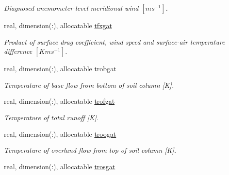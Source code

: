 \begin{DoxyCompactItemize}
\begin{DoxyCompactList}\small\item\em Diagnosed anemometer-\/level meridional wind $[m s^{-1} ]$. \end{DoxyCompactList}\item 
\hypertarget{structclass__statevars_1_1class__gather_ada173f81ba750dffb853c6eeaf18708c}{}real, dimension(\+:), allocatable \hyperlink{structclass__statevars_1_1class__gather_ada173f81ba750dffb853c6eeaf18708c}{tfxgat}\label{structclass__statevars_1_1class__gather_ada173f81ba750dffb853c6eeaf18708c}

\begin{DoxyCompactList}\small\item\em Product of surface drag coefficient, wind speed and surface-\/air temperature difference $[K m s^{-1} ]$. \end{DoxyCompactList}\item 
\hypertarget{structclass__statevars_1_1class__gather_ab547e49919cf3653a91898805ee2a340}{}real, dimension(\+:), allocatable \hyperlink{structclass__statevars_1_1class__gather_ab547e49919cf3653a91898805ee2a340}{trobgat}\label{structclass__statevars_1_1class__gather_ab547e49919cf3653a91898805ee2a340}

\begin{DoxyCompactList}\small\item\em Temperature of base flow from bottom of soil column \mbox{[}K\mbox{]}. \end{DoxyCompactList}\item 
\hypertarget{structclass__statevars_1_1class__gather_ab6fdaaf148cbc4f8eb3fe573b08c2d09}{}real, dimension(\+:), allocatable \hyperlink{structclass__statevars_1_1class__gather_ab6fdaaf148cbc4f8eb3fe573b08c2d09}{trofgat}\label{structclass__statevars_1_1class__gather_ab6fdaaf148cbc4f8eb3fe573b08c2d09}

\begin{DoxyCompactList}\small\item\em Temperature of total runoff \mbox{[}K\mbox{]}. \end{DoxyCompactList}\item 
\hypertarget{structclass__statevars_1_1class__gather_ac94553a6f8c98502e4df4775e4a55cea}{}real, dimension(\+:), allocatable \hyperlink{structclass__statevars_1_1class__gather_ac94553a6f8c98502e4df4775e4a55cea}{troogat}\label{structclass__statevars_1_1class__gather_ac94553a6f8c98502e4df4775e4a55cea}

\begin{DoxyCompactList}\small\item\em Temperature of overland flow from top of soil column \mbox{[}K\mbox{]}. \end{DoxyCompactList}\item 
\hypertarget{structclass__statevars_1_1class__gather_a10b939977a028f679655a570c0ac3c53}{}real, dimension(\+:), allocatable \hyperlink{structclass__statevars_1_1class__gather_a10b939977a028f679655a570c0ac3c53}{trosgat}\label{structclass__statevars_1_1class__gather_a10b939977a028f679655a570c0ac3c53}


\end{DoxyCompactItemize}
